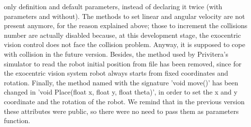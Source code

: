only definition and default parameters, instead of declaring it twice (with parameters and without). The methods to set
linear and angular velocity are not present anymore, for the reason explained above; those to increment the collisions number are
actually disabled because, at this development stage, the exocentric vision control does not face the collision problem.
Anyway, it is supposed to cope with collision in the future version.
\newline Besides, the method used by Privitera's simulator to read the robot initial position from file has been removed, since for
the exocentric vision system robot always starts from fixed coordinates and rotation.
\newline Finally, the method named with the signature 'void move()' has been changed in 'void Place(float x, float y, float theta)',
in order to set the x and y coordinate and the rotation of the robot. We remind that in the previous version these attributes
were public, so there were no need to pass them as parameters function.
